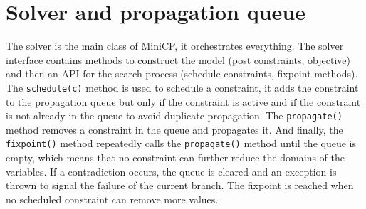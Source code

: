 \documentclass[12pt, openany]{report}
\theoremstyle{definition}
\begin{document}
\section{Solver and propagation queue} 
The solver is the main class of MiniCP, it orchestrates everything. The solver interface contains methods to construct the model (post constraints, objective) and then an API for the search process (schedule constraints, fixpoint methods). The \texttt{schedule(c)} method is used to schedule a constraint, it adds the constraint to the propagation queue but only if the constraint is active and if the constraint is not already in the queue to avoid duplicate propagation. The \texttt{propagate()} method removes a constraint in the queue and propagates it. And finally, the \texttt{fixpoint()} method repeatedly calls the \texttt{propagate()} method until the queue is empty, which means that no constraint can further reduce the domains of the variables. If a contradiction occurs, the queue is cleared and an exception is thrown to signal the failure of the current branch. The fixpoint is reached when no scheduled constraint can remove more values.
\end{document}
